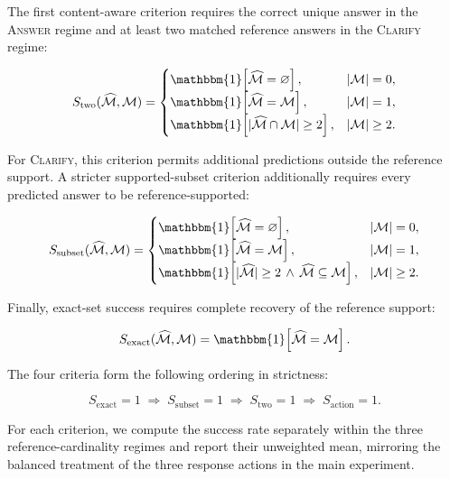The first content-aware criterion requires the correct unique answer in the \textsc{Answer} regime and at least two matched reference answers in the \textsc{Clarify} regime:

\[
S_{\mathrm{two}}(\widehat{\mathcal{M}},\mathcal{M})=
\begin{cases}
\mathbbm{1}\!\left[\widehat{\mathcal{M}}=\varnothing\right], & |\mathcal{M}|=0,\\
\mathbbm{1}\!\left[\widehat{\mathcal{M}}=\mathcal{M}\right], & |\mathcal{M}|=1,\\
\mathbbm{1}\!\left[|\widehat{\mathcal{M}}\cap\mathcal{M}|\geq2\right], & |\mathcal{M}|\geq2.
\end{cases}
\]

For \textsc{Clarify}, this criterion permits additional predictions outside the reference support. A stricter supported-subset criterion additionally requires every predicted answer to be reference-supported:

\[
S_{\mathrm{subset}}(\widehat{\mathcal{M}},\mathcal{M})=
\begin{cases}
\mathbbm{1}\!\left[\widehat{\mathcal{M}}=\varnothing\right], & |\mathcal{M}|=0,\\
\mathbbm{1}\!\left[\widehat{\mathcal{M}}=\mathcal{M}\right], & |\mathcal{M}|=1,\\
\mathbbm{1}\!\left[|\widehat{\mathcal{M}}|\geq2 \,\land\, \widehat{\mathcal{M}}\subseteq\mathcal{M}\right], & |\mathcal{M}|\geq2.
\end{cases}
\]

Finally, exact-set success requires complete recovery of the reference support:

\[
S_{\mathrm{exact}}(\widehat{\mathcal{M}},\mathcal{M})=\mathbbm{1}\!\left[\widehat{\mathcal{M}}=\mathcal{M}\right].
\]

The four criteria form the following ordering in strictness:

\[
S_{\mathrm{exact}}=1
\;\Longrightarrow\;
S_{\mathrm{subset}}=1
\;\Longrightarrow\;
S_{\mathrm{two}}=1
\;\Longrightarrow\;
S_{\mathrm{action}}=1.
\]

For each criterion, we compute the success rate separately within the three reference-cardinality regimes and report their unweighted mean, mirroring the balanced treatment of the three response actions in the main experiment.


